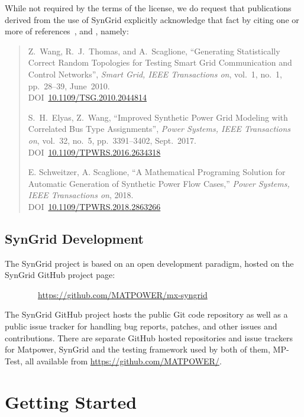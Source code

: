 \documentclass[12pt]{article}
\newcommand{\matpower}[0]{{\sc Matpower}}
\newcommand{\mptest}[0]{{MP-Test}}
\newcommand{\syngrid}[0]{{SynGrid}}
\newcommand{\syngridurl}[0]{https://github.com/MATPOWER/mx-syngrid}
\numberwithin{equation}{section}
\numberwithin{table}{section}
\numberwithin{figure}{section}
\begin{document}
While not required by the terms of the license, we do request that publications derived from the use of \syngrid{} explicitly acknowledge that fact by citing one or more of references~\cite{syngrid_nestedSW}, \cite{syngrid_bustype} and \cite{schweitzer2018mathematical}, namely:

\begin{quote}
\footnotesize
Z.~Wang, R.~J.~Thomas, and A.~Scaglione, ``Generating Statistically Correct Random Topologies for Testing Smart Grid Communication and Control Networks'', \emph{Smart Grid, IEEE Transactions on}, vol.~1, no.~1, pp.~28--39, June~2010. \\
DOI~\href{https://doi.org/10.1109/TSG.2010.2044814}{10.1109/TSG.2010.2044814}

S.~H.~Elyas, Z.~Wang, ``Improved Synthetic Power Grid Modeling with Correlated Bus Type Assignments'', \emph{Power Systems, IEEE Transactions on}, vol.~32, no.~5, pp.~3391--3402, Sept.~2017. \\
DOI~\href{https://doi.org/10.1109/TPWRS.2016.2634318}{10.1109/TPWRS.2016.2634318}

E. Schweitzer, A. Scaglione, ``A Mathematical Programing Solution for Automatic Generation of Synthetic Power Flow Cases,''  \emph{Power Systems, IEEE Transactions on}, 2018. \\
DOI~\href{https://doi.org/10.1109/TPWRS.2018.2863266}{10.1109/TPWRS.2018.2863266}
\end{quote}

\subsection{\syngrid{} Development}
\label{sec:development}

The \syngrid{} project is based on an open development paradigm, hosted on the \syngrid{} GitHub project page:

\bigskip

~~~~~~~~\url{\syngridurl}

\bigskip

The \syngrid{} GitHub project hosts the public Git code repository as well as a public issue tracker for handling bug reports, patches, and other issues and contributions. There are separate GitHub hosted repositories and issue trackers for \matpower{}, \syngrid{} and the testing framework used by both of them, \mptest{}, all available from \url{https://github.com/MATPOWER/}.


\section{Getting Started}
\end{document}
